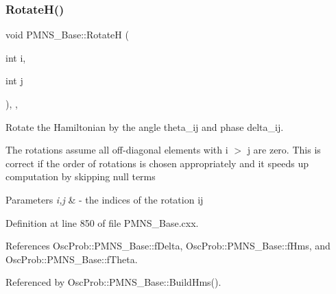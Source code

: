 \subsubsection{\texorpdfstring{Rotate\+H()}{RotateH()}}
{\footnotesize\ttfamily void P\+M\+N\+S\+\_\+\+Base\+::\+RotateH (\begin{DoxyParamCaption}\item[{int}]{i,  }\item[{int}]{j }\end{DoxyParamCaption})\hspace{0.3cm}{\ttfamily [protected]}, {\ttfamily [virtual]}, {\ttfamily [inherited]}}

Rotate the Hamiltonian by the angle theta\+\_\+ij and phase delta\+\_\+ij.

The rotations assume all off-\/diagonal elements with i $>$ j are zero. This is correct if the order of rotations is chosen appropriately and it speeds up computation by skipping null terms


\begin{DoxyParams}{Parameters}
{\em i,j} & -\/ the indices of the rotation ij \\
\hline
\end{DoxyParams}


Definition at line 850 of file P\+M\+N\+S\+\_\+\+Base.\+cxx.



References Osc\+Prob\+::\+P\+M\+N\+S\+\_\+\+Base\+::f\+Delta, Osc\+Prob\+::\+P\+M\+N\+S\+\_\+\+Base\+::f\+Hms, and Osc\+Prob\+::\+P\+M\+N\+S\+\_\+\+Base\+::f\+Theta.



Referenced by Osc\+Prob\+::\+P\+M\+N\+S\+\_\+\+Base\+::\+Build\+Hms().


